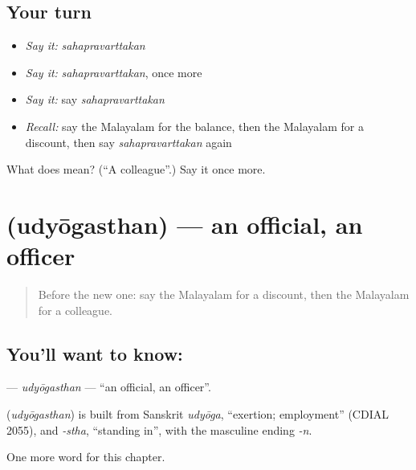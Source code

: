 \subsection*{Your turn}
\begin{itemize}
\raggedright
  \item \emph{Say it:} \emph{sahapravarttakan}
  \item \emph{Say it:} \emph{sahapravarttakan}, once more
  \item \emph{Say it:} say \emph{sahapravarttakan}
  \item \emph{Recall:} say the Malayalam for the balance, then the Malayalam for a discount, then say \emph{sahapravarttakan} again
\end{itemize}

\begin{tcolorbox}[breakable,colback=teal!4,colframe=teal!35!black,title={Before you move on}]
What does  mean? (\textquotedblleft{}A colleague\textquotedblright{}.) Say it once more.
\end{tcolorbox}
\section[\texorpdfstring{\ml{ഉദ്യോഗസ്ഥൻ} (udyōgasthan)}{ഉദ്യോഗസ്ഥൻ (udyōgasthan)}]{ (udyōgasthan) — an official, an officer}

\label{lesson:ML-C220-udyogasthan}



\begin{quote}
Before the new one: say the Malayalam for a discount, then the Malayalam for a colleague.
\end{quote}

\subsection*{You'll want to know: }
\textbf{} — \emph{udyōgasthan} — \textquotedblleft{}an official, an officer\textquotedblright{}.

\begin{cousinweb}
\textbf{} (\emph{udyōgasthan}) is built from Sanskrit \emph{udyōga}, \textquotedblleft{}exertion; employment\textquotedblright{} (CDIAL 2055), and \emph{-stha}, \textquotedblleft{}standing in\textquotedblright{}, with the masculine ending \emph{-n}.
\end{cousinweb}

\begin{grammarlens}[title={What you've built}]
One more word for this chapter.
\end{grammarlens}

